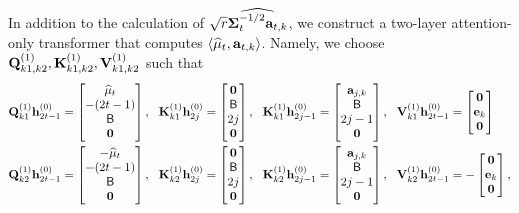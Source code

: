   
In addition to the calculation of  $\sqrt{{r}}\widehat{{{\mathbf\Sigma}}_t^{-1/2}{\mathbf a}_{t,k}}$, we construct a two-layer attention-only transformer that computes $\left\langle\widehat{{{\mathbf\mu}}}_t,{\mathbf a}_{t,k}\right\rangle$. Namely, we choose ${\mathbf Q}^{(1)}_{k1,k2},{\mathbf K}^{(1)}_{k1,k2},{\mathbf V}^{(1)}_{k1,k2}$ such that
\begin{align*}
    &{\mathbf Q}_{k1}^{(1)}{\mathbf h}^{(0)}_{2t-1}=\begin{bmatrix}
        \widehat{{{\mathbf\mu}}}_t\\-(2t-1)\\ {\mathsf{B}} \\{\mathbf 0}
    \end{bmatrix},~~ {\mathbf K}_{k1}^{(1)}{\mathbf h}^{(0)}_{2j}=\begin{bmatrix}
     {\mathbf 0}\\  {\mathsf{B}}\\ 2j\\{\mathbf 0}
\end{bmatrix},~~{\mathbf K}_{k1}^{(1)}{\mathbf h}^{(0)}_{2j-1}=\begin{bmatrix}
    {\mathbf a}_{j,k}\\  {\mathsf{B}}\\ 2j-1\\{\mathbf 0}
\end{bmatrix},~~ {\mathbf V}_{k1}^{(1)}{\mathbf h}^{(0)}_{2t-1}=\begin{bmatrix}
        {\mathbf 0}\\ {\mathbf e}_k \\ {\mathbf 0}
    \end{bmatrix}
    \\
      &{\mathbf Q}_{k2}^{(1)}{\mathbf h}^{(0)}_{2t-1}=\begin{bmatrix}
        -\widehat{{{\mathbf\mu}}}_t\\-(2t-1)\\ {\mathsf{B}} \\{\mathbf 0}
    \end{bmatrix},~~ {\mathbf K}_{k2}^{(1)}{\mathbf h}^{(0)}_{2j}=\begin{bmatrix}
     {\mathbf 0}\\  {\mathsf{B}}\\ 2j\\{\mathbf 0}
\end{bmatrix},~~{\mathbf K}_{k2}^{(1)}{\mathbf h}^{(0)}_{2j-1}=\begin{bmatrix}
    {\mathbf a}_{j,k}\\  {\mathsf{B}}\\ 2j-1\\{\mathbf 0}
\end{bmatrix},~~ {\mathbf V}_{k2}^{(1)}{\mathbf h}^{(0)}_{2t-1}=-\begin{bmatrix}
        {\mathbf 0}\\ {\mathbf e}_k \\ {\mathbf 0}
    \end{bmatrix},
\end{align*}
